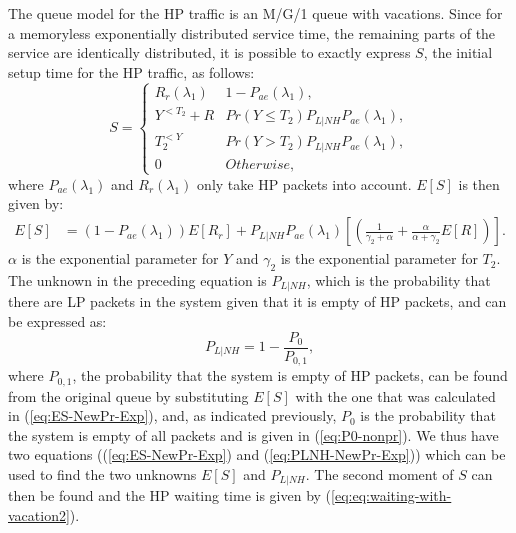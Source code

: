 \documentclass[11pt,journal,oneside,onecolumn,draftclsnofoot]{IEEEtran}
\begin{document}
The queue model for the HP traffic is an M/G/1 queue with vacations. Since for a memoryless exponentially distributed service time, the remaining parts of the service are identically distributed, it is possible to exactly express $S$, the initial setup time for the HP traffic, as follows:
\begin{equation}
S=\begin{cases}
R_r(\lambda_1)& 1-P_{ae}(\lambda_1), \\
Y^{<T_2}+R&  Pr(Y \leq T_2)P_{L|NH}P_{ae}(\lambda_1),\\
T_2^{<Y}& Pr(Y>T_2)P_{L|NH}P_{ae}(\lambda_1),\\
0& Otherwise, 
\end{cases}
\label{eq:W1-Estimation-Exp-NewPr}
\end{equation}
where $P_{ae}(\lambda_1)$ and $R_r(\lambda_1)$ only take HP packets into account. $E[S]$ is then given by:
\begin{align}
E[S]&=(1-P_{ae}(\lambda_1))E[R_r]+P_{L|NH}P_{ae}(\lambda_1)\left[(\frac{1}{\gamma_2+\alpha}+\frac{\alpha}{\alpha+\gamma_2} E[R])\right].
\label{eq:ES-NewPr-Exp}
\end{align}
$\alpha$ is the exponential parameter for $Y$ and $\gamma_2$ is the exponential parameter for $T_2$.
The unknown in the preceding equation is $P_{L|NH}$, which is the probability that there are LP packets in the system given that it is empty of HP packets, and can be expressed as:
\begin{equation}
P_{L|NH}= 1-\frac{P_0}{P_{0,1}},
\label{eq:PLNH-NewPr-Exp}
\end{equation}
where $P_{0,1}$, the probability that the system is empty of HP packets,  can be found from the original queue by substituting $E[S]$ with the one that was calculated in (\ref{eq:ES-NewPr-Exp}), and, as indicated previously, $P_0$ is the probability that the system is empty of all packets and is given in (\ref{eq:P0-nonpr}). We thus have two equations ((\ref{eq:ES-NewPr-Exp}) and (\ref{eq:PLNH-NewPr-Exp})) which can be used to find the two unknowns $E[S]$ and $P_{L|NH}$. The second moment of $S$ can then be found and the HP waiting time is given by (\ref{eq:eq:waiting-with-vacation2}).
\end{document}
